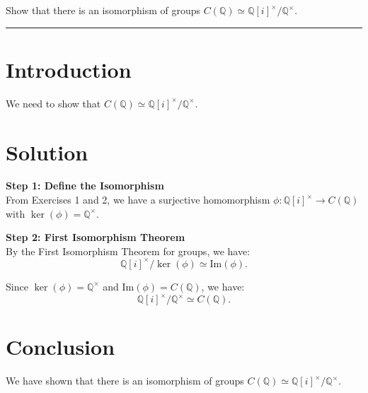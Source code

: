 \documentclass[12pt]{amsart}
\theoremstyle{definition}
\numberwithin{equation}{section}
\newcommand{\Q}{\mathbb{Q}}
\begin{document}
\newpage
\begin{exercise}{4} Show that there is an isomorphism of groups \(C(\Q) \simeq \Q{[i]}^{\times} / \Q^{\times }\).

    \noindent\rule{\linewidth}{1pt}

    \section*{Introduction}
    We need to show that \(C(\Q) \simeq \Q{[i]}^{\times} / \Q^{\times}\).

    \section*{Solution}
    \noindent \textbf{Step 1: Define the Isomorphism}\\
    From Exercises 1 and 2, we have a surjective homomorphism \(\phi: \Q{[i]}^{\times} \rightarrow C(\Q)\) with \(\ker(\phi) = \Q^{\times}\).

    \noindent \textbf{Step 2: First Isomorphism Theorem}\\
    By the First Isomorphism Theorem for groups, we have:
    \[
    \Q{[i]}^{\times} / \ker(\phi) \simeq \text{Im}(\phi).
    \]

    Since \(\ker(\phi) = \Q^{\times}\) and \(\text{Im}(\phi) = C(\Q)\), we have:
    \[
    \Q{[i]}^{\times} / \Q^{\times} \simeq C(\Q).
    \]

    \section*{Conclusion}
    We have shown that there is an isomorphism of groups \(C(\Q) \simeq \Q{[i]}^{\times} / \Q^{\times}\).

\end{exercise}
\newpage
\end{document}

